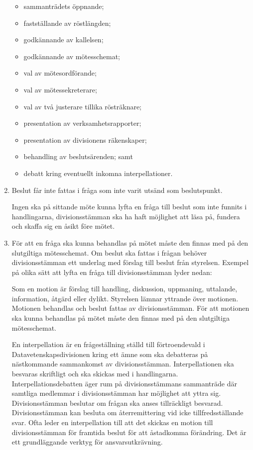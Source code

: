 \documentclass{dvd}
\begin{document}
\begin{enumerate}[label=\arabic* §, ref=\arabic*]
		\begin{itemize}
			\item sammanträdets öppnande;
			\item fastställande av röstlängden;
			\item godkännande av kallelsen;
			\item godkännande av mötesschemat;
			\item val av mötesordförande;
			\item val av mötessekreterare;
			\item val av två justerare tillika rösträknare;
			\item presentation av verksamhetsrapporter;
			\item presentation av divisionens räkenskaper;
			\item behandling av beslutsärenden; samt
			\item debatt kring eventuellt inkomna interpellationer.
		\end{itemize}

		\item Beslut får inte fattas i fråga som inte varit utsänd som beslutspunkt.

		Ingen ska på sittande möte kunna lyfta en fråga till beslut som inte funnits i handlingarna, divisionsstämman ska ha haft möjlighet att läsa på, fundera och skaffa sig en åsikt före mötet.

		\item För att en fråga ska kunna behandlas på mötet måste den finnas med på den slutgiltiga mötesschemat.
		Om beslut ska fattas i frågan behöver divisionsstämman ett underlag med förslag till beslut från styrelsen.
		Exempel på olika sätt att lyfta en fråga till divisionsstämman lyder nedan:

		Som en motion är förslag till handling, diskussion, uppmaning, uttalande, information, åtgärd eller dylikt.
		Styrelsen lämnar yttrande över motionen.
		Motionen behandlas och beslut fattas av divisionsstämman.
		För att motionen ska kunna behandlas på mötet måste den finnas med på den slutgiltiga mötesschemat.

		En interpellation är en frågeställning ställd till förtroendevald i Datavetenskapsdivisionen kring ett ämne som ska debatteras på nästkommande sammankomst av divisionsstämman.
		Interpellationen ska besvaras skriftligt och ska skickas med i handlingarna.
		Interpellationsdebatten äger rum på divisionsstämmans sammanträde där samtliga medlemmar i divisionsstämman har möjlighet att yttra sig.
		Divisionsstämman beslutar om frågan ska anses tillräckligt besvarad.
		Divisionsstämman kan besluta om återremittering vid icke tillfredsställande svar.
		Ofta leder en interpellation till att det skickas en motion till divisionsstämman för framtida beslut för att åstadkomma förändring.
		Det är ett grundläggande verktyg för ansvarsutkrävning.


\end{enumerate}
\end{document}
